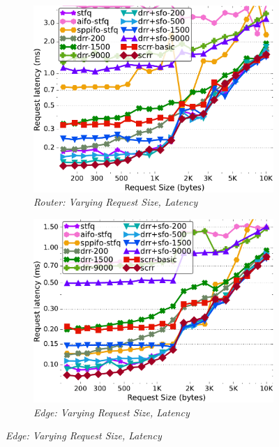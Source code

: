 \begin{figure}[th!]
  \centering
  \begin{subfigure}[t]{.30\linewidth}
    \centering
    \includegraphics[width=0.95\linewidth]{figs/pkt_size_cn_2t4x16_mn_2tb2x4_bbr3_lat_comp_drr_scrr.pdf}
    \caption{\small{\textit{Router: Varying Request Size, Latency}}}
    \label{fig:request-bbr3-latency-sched-full}
  \end{subfigure}
  \begin{subfigure}[t]{.30\linewidth}
    \centering
    \includegraphics[width=0.95\linewidth]{figs/pkt_size_edge_cn_2t1x32_mn_2tb1x8_bbr3_lat_comp_drr_scrr.pdf}
    \caption{\small{\textit{Edge: Varying Request Size, Latency}}}
    \label{fig:request-edge-bbr3-latency-sched-full}
  \end{subfigure}

\end{figure}
